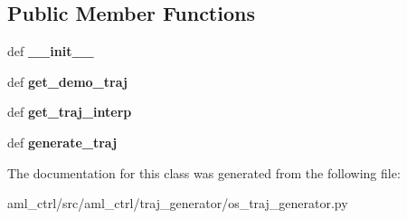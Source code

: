 \subsection*{Public Member Functions}
\begin{DoxyCompactItemize}
\item 
\hypertarget{classaml__ctrl_1_1traj__generator_1_1os__traj__generator_1_1_o_s_traj_generator_a6ec1d5c81566a37b7f1d9b8393e77e0a}{def {\bfseries \-\_\-\-\_\-init\-\_\-\-\_\-}}\label{classaml__ctrl_1_1traj__generator_1_1os__traj__generator_1_1_o_s_traj_generator_a6ec1d5c81566a37b7f1d9b8393e77e0a}

\item 
\hypertarget{classaml__ctrl_1_1traj__generator_1_1os__traj__generator_1_1_o_s_traj_generator_ac6e97fc62f4857a0fa9918052750b1a3}{def {\bfseries get\-\_\-demo\-\_\-traj}}\label{classaml__ctrl_1_1traj__generator_1_1os__traj__generator_1_1_o_s_traj_generator_ac6e97fc62f4857a0fa9918052750b1a3}

\item 
\hypertarget{classaml__ctrl_1_1traj__generator_1_1os__traj__generator_1_1_o_s_traj_generator_a19d9bdbd9fb9324521bbb82d87a5f800}{def {\bfseries get\-\_\-traj\-\_\-interp}}\label{classaml__ctrl_1_1traj__generator_1_1os__traj__generator_1_1_o_s_traj_generator_a19d9bdbd9fb9324521bbb82d87a5f800}

\item 
\hypertarget{classaml__ctrl_1_1traj__generator_1_1os__traj__generator_1_1_o_s_traj_generator_a8aada8b557aa8fe588315a9f70ec6edd}{def {\bfseries generate\-\_\-traj}}\label{classaml__ctrl_1_1traj__generator_1_1os__traj__generator_1_1_o_s_traj_generator_a8aada8b557aa8fe588315a9f70ec6edd}

\end{DoxyCompactItemize}


The documentation for this class was generated from the following file\-:\begin{DoxyCompactItemize}
\item 
aml\-\_\-ctrl/src/aml\-\_\-ctrl/traj\-\_\-generator/os\-\_\-traj\-\_\-generator.\-py\end{DoxyCompactItemize}
